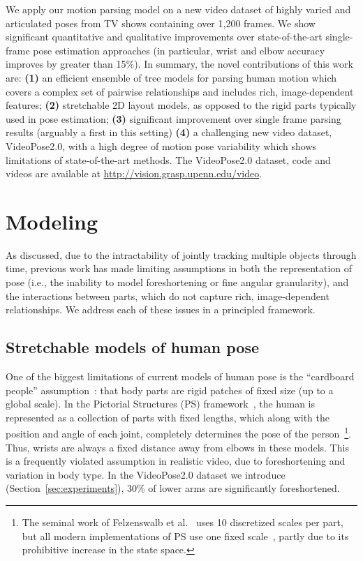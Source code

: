We apply our motion parsing model on a new video dataset of highly varied and 
articulated poses from TV shows containing over 1,200 frames.  We show 
significant quantitative and qualitative improvements over state-of-the-art 
single-frame pose estimation approaches (in particular, wrist and elbow 
accuracy improves by greater than 15\%).  In summary, the novel contributions 
of this work are: \textbf{(1)} an efficient ensemble of tree models for parsing 
human motion which covers a complex set of pairwise relationships and includes 
rich, image-dependent features; \textbf{(2)} stretchable 2D layout models, as 
opposed to the rigid parts typically used in pose estimation;
\textbf{(3)} significant improvement over single frame parsing results 
(arguably a first in this setting) \textbf{(4)} a challenging new video dataset, VideoPose2.0, 
with a high degree of motion pose variability which shows limitations of 
state-of-the-art methods.  The VideoPose2.0 dataset, code and videos are available at 
\url{http://vision.grasp.upenn.edu/video}.



\section{Modeling}\label{sec:model}
As discussed, due to the intractability of jointly tracking multiple objects through time, previous 
work has made limiting assumptions in both the representation of pose (i.e., 
the inability to model foreshortening or fine angular granularity), and the 
interactions between parts, which do not capture rich, image-dependent 
relationships.  We address each of these issues in a principled framework.

\subsection{Stretchable models of human pose}  One of the biggest limitations 
of current models of human pose is the ``cardboard people'' 
assumption~\cite{cardboard02}: that body parts are rigid patches of fixed size 
(up to a global scale).  In the Pictorial Structures (PS) framework~\cite{felzps}, the human is represented as a collection of parts with fixed lengths, 
which along with the position and angle of each joint, completely determines 
the pose of the person~\footnote{The seminal work of Felzenswalb et 
al.~\cite{felzps} uses 10 discretized scales per part, 
but all modern implementations of PS use one fixed scale~\cite{sapp2010cascades,ferrari08,andriluka09}, partly due to its prohibitive 
increase in the state space.}.  Thus, wrists are always a fixed distance away 
from elbows in these models. This is a frequently violated assumption in 
realistic video, due to foreshortening and variation in body type.  In the VideoPose2.0 dataset we  
introduce (Section~\ref{sec:experiments}), 30\% of lower arms 
are significantly foreshortened.

